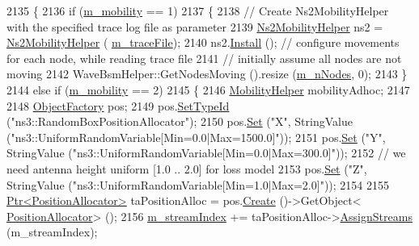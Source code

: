 \begin{DoxyCode}
2135 \{
2136   \textcolor{keywordflow}{if} (\hyperlink{classVanetRoutingExperiment_a1ab9e6d4a9fcfabb7b6fd820a39f63e3}{m\_mobility} == 1)
2137     \{
2138       \textcolor{comment}{// Create Ns2MobilityHelper with the specified trace log file as parameter}
2139       \hyperlink{classns3_1_1Ns2MobilityHelper}{Ns2MobilityHelper} ns2 = \hyperlink{classns3_1_1Ns2MobilityHelper}{Ns2MobilityHelper} (
      \hyperlink{classVanetRoutingExperiment_a71d4ca6c5a1d376e7313ffa30418622e}{m\_traceFile});
2140       ns2.\hyperlink{classns3_1_1Ns2MobilityHelper_ae54f17492e3efd54ff7501566fc6e9cf}{Install} (); \textcolor{comment}{// configure movements for each node, while reading trace file}
2141       \textcolor{comment}{// initially assume all nodes are not moving}
2142       WaveBsmHelper::GetNodesMoving ().resize (\hyperlink{classVanetRoutingExperiment_ac2bf996dc9fe3163f8a720acbf4f6f85}{m\_nNodes}, 0);
2143     \}
2144   \textcolor{keywordflow}{else} \textcolor{keywordflow}{if} (\hyperlink{classVanetRoutingExperiment_a1ab9e6d4a9fcfabb7b6fd820a39f63e3}{m\_mobility} == 2)
2145     \{
2146       \hyperlink{classns3_1_1MobilityHelper}{MobilityHelper} mobilityAdhoc;
2147 
2148       \hyperlink{classns3_1_1ObjectFactory}{ObjectFactory} pos;
2149       pos.\hyperlink{classns3_1_1ObjectFactory_a77dcd099064038a1eb7a6b8251229ec3}{SetTypeId} (\textcolor{stringliteral}{"ns3::RandomBoxPositionAllocator"});
2150       pos.\hyperlink{classns3_1_1ObjectFactory_aef5c0d5019c96bdf01cefd1ff83f4a68}{Set} (\textcolor{stringliteral}{"X"}, StringValue (\textcolor{stringliteral}{"ns3::UniformRandomVariable[Min=0.0|Max=1500.0]"}));
2151       pos.\hyperlink{classns3_1_1ObjectFactory_aef5c0d5019c96bdf01cefd1ff83f4a68}{Set} (\textcolor{stringliteral}{"Y"}, StringValue (\textcolor{stringliteral}{"ns3::UniformRandomVariable[Min=0.0|Max=300.0]"}));
2152       \textcolor{comment}{// we need antenna height uniform [1.0 .. 2.0] for loss model}
2153       pos.\hyperlink{classns3_1_1ObjectFactory_aef5c0d5019c96bdf01cefd1ff83f4a68}{Set} (\textcolor{stringliteral}{"Z"}, StringValue (\textcolor{stringliteral}{"ns3::UniformRandomVariable[Min=1.0|Max=2.0]"}));
2154 
2155       \hyperlink{classns3_1_1Ptr}{Ptr<PositionAllocator>} taPositionAlloc = pos.\hyperlink{classns3_1_1ObjectFactory_a18152e93f0a6fe184ed7300cb31e9896}{Create} ()->GetObject<
      \hyperlink{classns3_1_1PositionAllocator}{PositionAllocator}> ();
2156       \hyperlink{classVanetRoutingExperiment_a3c86fdbcf9e422486ba1d75020a9c90e}{m\_streamIndex} += taPositionAlloc->\hyperlink{classns3_1_1PositionAllocator_a654c787e42def6e4463731d50b337057}{AssignStreams} (m\_streamIndex);

\end{DoxyCode}
